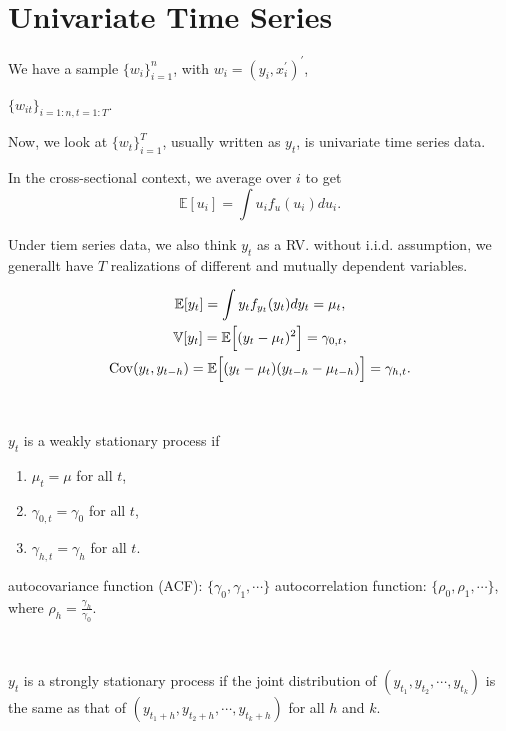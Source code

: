 \section{Univariate Time Series}

We have a sample $\{w_i\}_{i=1}^n$, with $w_i = (y_i, x_i^{\prime})^{\prime}$, 

$\{w_{it}\}_{i=1:n, t=1:T}$.

Now, we look at $\{w_t\}_{i=1}^T$, usually written as $y_t$, is univariate time series data.

In the cross-sectional context, we average over $i$ to get 
\[\mathbb{E}[u_i] = \int u_i f_u(u_i) d u_i.\]

Under tiem series data, we also think $y_t$ as a RV. without i.i.d. assumption,
we generallt have $T$ realizations of different and mutually dependent variables.

\begin{gather*}
    \mathbb{E}[y_t] = \int y_t f_{y_t}(y_t) d y_t = \mu_t, \\
    \mathbb{V}[y_t] = \mathbb{E}\Bigl[(y_t - \mu_t)^2 \Bigr] = \gamma_{0,t}, \\
    \operatorname{Cov}(y_t, y_{t-h}) = \mathbb{E}\Bigl[ (y_t - \mu_t)(y_{t-h} - \mu_{t-h}  ) \Bigr] = \gamma_{h,t}.
\end{gather*}

\begin{definition}\label{def:weak-stationarity}
    \

    $y_t$ is a weakly stationary process if
    \begin{enumerate}
        \item $\mu_t = \mu$ for all $t$,
        \item $\gamma_{0,t} = \gamma_0$ for all $t$,
        \item $\gamma_{h,t} = \gamma_h$ for all $t$.
    \end{enumerate}
    autocovariance function (ACF): $\{\gamma_0, \gamma_1, \cdots\}$
    autocorrelation function: $\{\rho_0, \rho_1, \cdots \}$, where $\rho_h = \frac{\gamma_h}{\gamma_0}$.
\end{definition}


\begin{definition}\label{def:strong-stationarity}
    \

    $y_t$ is a strongly stationary process if the joint distribution of $(y_{t_1}, y_{t_2}, \cdots, y_{t_k})$
    is the same as that of $(y_{t_1+h}, y_{t_2+h}, \cdots, y_{t_k+h})$ for all $h$ and $k$.
\end{definition}

